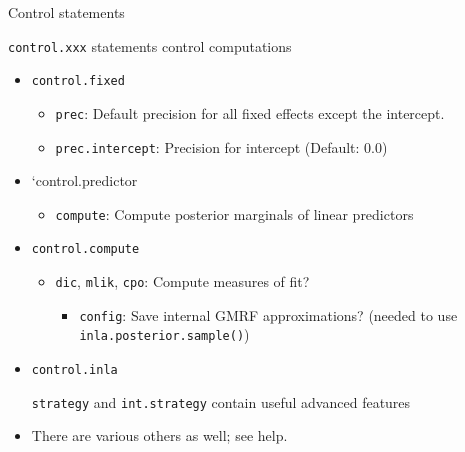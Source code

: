 \documentclass[
  ignorenonframetext,
]{beamer}
\providecommand{\tightlist}{%
  \setlength{\itemsep}{0pt}\setlength{\parskip}{0pt}}
\begin{document}
\begin{frame}[fragile]{Control statements}
\protect\hypertarget{control-statements-1}{}
\small

\texttt{control.xxx} statements control computations

\begin{itemize}
\item
  \texttt{control.fixed}

  \begin{itemize}
  \tightlist
  \item
    \texttt{prec}: Default precision for all fixed effects except the
    intercept.
  \item
    \texttt{prec.intercept}: Precision for intercept (Default: 0.0)
  \end{itemize}
\item
  `control.predictor

  \begin{itemize}
  \tightlist
  \item
    \texttt{compute}: Compute posterior marginals of linear predictors
  \end{itemize}
\item
  \texttt{control.compute}

  \begin{itemize}
  \item
    \texttt{dic}, \texttt{mlik}, \texttt{cpo}: Compute measures of fit?

    \begin{itemize}
    \tightlist
    \item
      \texttt{config}: Save internal GMRF approximations? (needed to use
      \texttt{inla.posterior.sample()})
    \end{itemize}
  \end{itemize}
\item
  \texttt{control.inla}

  \texttt{strategy} and \texttt{int.strategy} contain useful advanced
  features
\item
  There are various others as well; see help.
\end{itemize}

\normalsize
\end{frame}
\end{document}

